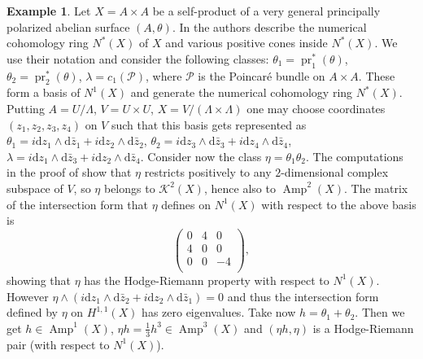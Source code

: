 \documentclass[a4,reqno]{amsart}
\theoremstyle{definition}
\newtheorem{example}[theorem]{Example}
\def\cP{\mathcal P}
\def\cK{\mathcal K}
\DeclareMathOperator{\Amp}{Amp}
\def\d{\mbox{d}}
\DeclareMathOperator{\pr}{pr}
\numberwithin{equation}{section}
\begin{document}
\begin{example}\label{ex:delv}
Let $X=A\times A$ be a self-product of a very general principally polarized abelian surface $(A,\theta)$. In \cite{DELV11} the authors describe the numerical cohomology ring $N^*(X)$ of $X$ and various positive cones inside $N^*(X)$. We use their notation 
and consider the following classes:  $\theta_1=\pr_1^*(\theta)$, $\theta_2=\pr_2^*(\theta)$, $\lambda=c_1(\cP)$, where $\cP$ is the Poincar\'e bundle on $A\times A$. These form a basis of  $N^1(X)$ and generate the numerical cohomology ring $N^*(X)$. 
Putting 
$A=U/\Lambda$, $V=U\times U$, $X=V/(\Lambda\times\Lambda)$ one may choose coordinates $(z_1,z_2,z_3,z_4)$ on $V$ such that this basis gets represented as $\theta_1=i\d z_1\wedge \d\bar z_1 +i\d z_2\wedge \d\bar z_2$, $\theta_2=i\d z_3\wedge \d\bar z_3 +i\d z_4\wedge \d\bar z_4$, $\lambda=i\d z_1\wedge \d\bar z_3 +i\d z_2\wedge \d\bar z_4$. Consider now the class $\eta=\theta_1\theta_2$. The computations in the proof of \cite[Proposition 4.4]{DELV11} show that $\eta$ restricts positively to any $2$-dimensional complex subspace of $V$, so $\eta$ belongs to $\cK^2(X)$, hence also to $\Amp^2(X)$. The matrix of the intersection form that $\eta$ defines on $N^1(X)$ with respect to the above basis is
$$\left(\begin{array}{ccc} 0 & 4 &0\\
4 & 0 &0\\
0 & 0&-4\\
\end{array}\right),$$
showing that $\eta$ has the Hodge-Riemann property with respect to $N^1(X)$. However 
$\eta\wedge(i\d z_1\wedge \d\bar z_2 +i\d z_2\wedge \d\bar z_1)=0$ and thus the intersection form defined by $\eta$ on $H^{1,1}(X)$ has zero eigenvalues. 
Take now $h=\theta_1+\theta_2$. %
Then we get $h\in\Amp^1(X)$, $\eta h=\frac{1}{3}h^3\in\Amp^3(X)$ and $(\eta h,\eta)$ is a Hodge-Riemann pair (with respect to $N^1(X)$).
\end{example}
\end{document}
